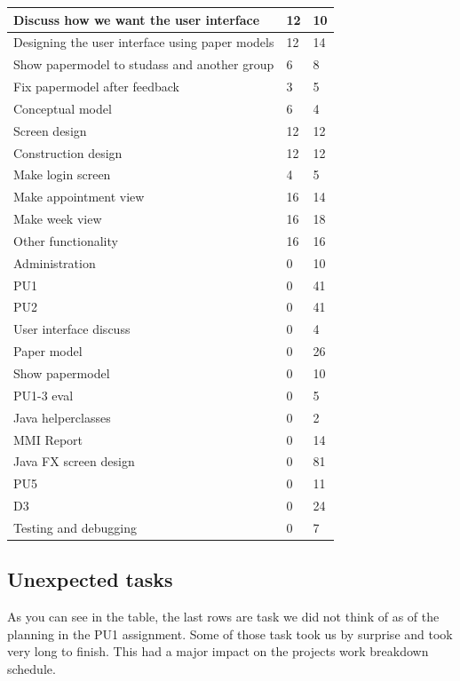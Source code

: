 \documentclass[a4paper, 10pt]{article}
\begin{document}
\begin{tabularx}{\textwidth}{ |X|X|X| }
\hline
\rowcolor{Gray}

Discuss how we want the user interface & 12  & 10\\ \hline
Designing the user interface using paper models & 12  & 14\\ \hline    
Show papermodel to studass and another group & 6  & 8\\ \hline
Fix papermodel after feedback & 3  & 5 \\ \hline
Conceptual model & 6  & 4\\ \hline
Screen design & 12  & 12\\ \hline
Construction design & 12  & 12\\ \hline
Make login screen & 4  & 5\\ \hline
Make appointment view & 16  & 14\\ \hline
Make week view & 16  & 18\\ \hline
Other functionality & 16  & 16\\ \hline
\hline
Administration & 0 & 10 \\ \hline
PU1 & 0 & 41 \\ \hline
PU2 & 0 & 41 \\ \hline
User interface discuss & 0 & 4 \\ \hline
Paper model & 0 & 26 \\ \hline
Show papermodel & 0 & 10 \\ \hline
PU1-3 eval & 0 & 5 \\ \hline
Java helperclasses & 0 & 2 \\ \hline
MMI Report & 0 & 14 \\ \hline
Java FX screen design & 0 & 81 \\ \hline
PU5 & 0 & 11 \\ \hline
D3 & 0 & 24 \\ \hline
Testing and debugging & 0 & 7 \\ \hline


\end{tabularx}

\subsection{Unexpected tasks}
As you can see in the table, the last rows are task we did not think of as of the planning in the PU1 assignment. Some of those task took us by surprise and took very long to finish. This had a major impact on the projects work breakdown schedule. 
\end{document}
